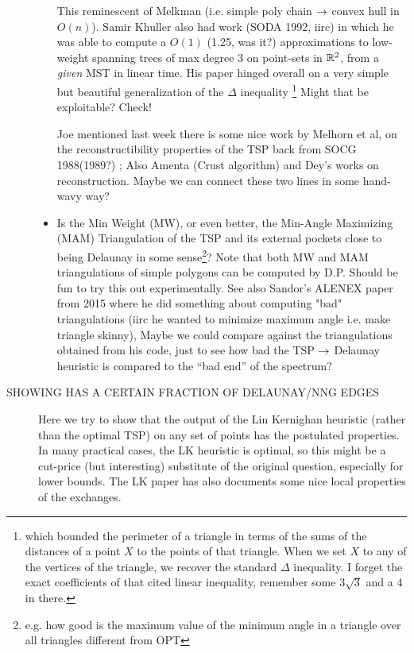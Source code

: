 \begin{appendices}
\begin{description}
\begin{itemize}
          This reminescent of Melkman (i.e. simple poly chain $\rightarrow$ convex hull in $O(n)$). Samir Khuller also had work (SODA 1992, iirc) 
          in which he was able to compute a $O(1)$ (1.25, was it?) approximations to low-weight spanning trees of max degree 3 on point-sets in $\mathbb{R}^2$, 
          from a \textit{given} MST in linear time. His paper hinged overall on a very simple but beautiful generalization of the $\Delta$ inequality 
          \footnote{which bounded the perimeter of a triangle in terms of the sums of the distances of a point $X$ to the points of that triangle. When we set $X$ to any of the vertices of the triangle, we recover the standard $\Delta$ inequality. I forget the exact coefficients of that cited linear inequality, remember some $3 \sqrt{3}$ and a 4 in there.}
          Might that be exploitable? Check! 

          Joe mentioned last week there is some nice work by Melhorn et al, on the reconstructibility properties of the TSP back from SOCG 1988(1989?) ;  Also
          Amenta (Crust algorithm) and Dey's works on reconstruction. Maybe we can connect these two lines in some hand-wavy way?  

   \item  Is the Min Weight (MW), or even better, the Min-Angle Maximizing (MAM) Triangulation of the TSP and its external pockets close 
          to being Delaunay in some sense\footnote{e.g. how good is the maximum value of the minimum angle in a triangle over all triangles different from OPT}?  
          Note that both MW and MAM triangulations of simple polygons can be computed by D.P. Should be fun to try this out experimentally. See also Sandor's 
          ALENEX paper from 2015 where he did something about computing "bad" triangulations (iirc he wanted to minimize maximum angle i.e. make triangle skinny), 
          Maybe we could compare against the triangulations obtained from his code, just to see how bad the TSP $\rightarrow$ Delaunay heuristic is compared 
          to the ``bad end'' of the spectrum? 

\end{itemize}  

\item[\color{red} SHOWING \cite{lin1973effective} HAS A CERTAIN FRACTION OF DELAUNAY/NNG EDGES] 
     Here we try to show that the output of the Lin Kernighan heuristic (rather than the optimal TSP) on any set of points has the postulated properties. In many practical 
     cases, the LK heuristic is optimal, so this might be a cut-price (but interesting) substitute of the original question, especially for lower bounds. 
     The LK paper has also documents some nice local properties of the exchanges.
     \newpage 


\end{description}
\end{appendices}
